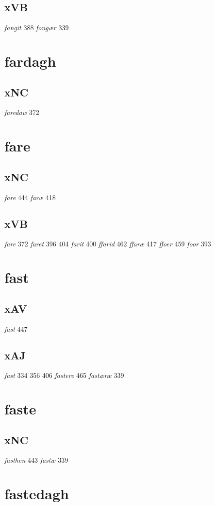 \documentclass[a4paper,twocolumn]{article}
\begin{document}
\subsection{xVB}
\label{sec:org2a07439}
\emph{fangit} 388 \emph{fongær} 339 
\section{fardagh}
\label{sec:org2e46ac0}
\subsection{xNC}
\label{sec:orgc443793}
\emph{faredaw} 372 
\section{fare}
\label{sec:org7f90abb}
\subsection{xNC}
\label{sec:orgaae1b6f}
\emph{fare} 444 \emph{faræ} 418 
\subsection{xVB}
\label{sec:org715ac58}
\emph{fare} 372 \emph{faret} 396 404 \emph{farit} 400 \emph{ffarid} 462 \emph{ffaræ} 417 \emph{ffoer} 459 \emph{foor} 393 
\section{fast}
\label{sec:orgb9df2bf}
\subsection{xAV}
\label{sec:org0d4540d}
\emph{fast} 447 
\subsection{xAJ}
\label{sec:orgd80c4ad}
\emph{fast} 334 356 406 \emph{fastere} 465 \emph{fastæræ} 339 
\section{faste}
\label{sec:orge4088d3}
\subsection{xNC}
\label{sec:org114692f}
\emph{fasthen} 443 \emph{fastæ} 339 
\section{fastedagh}
\label{sec:org4fc3cb7}
\end{document}
